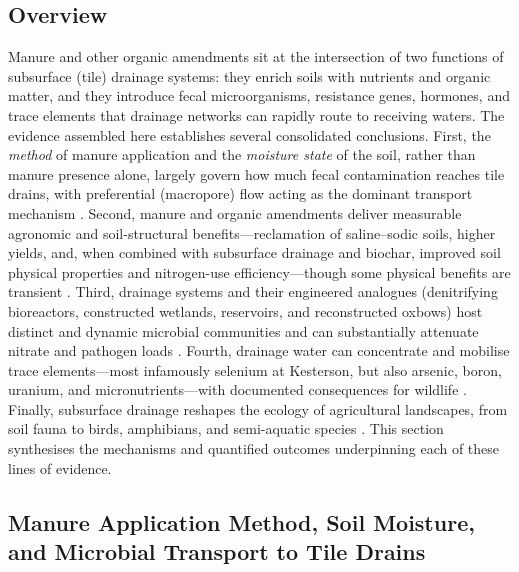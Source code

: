 \subsection{Overview}

Manure and other organic amendments sit at the intersection of two functions of subsurface (tile) drainage systems: they enrich soils with nutrients and organic matter, and they introduce fecal microorganisms, resistance genes, hormones, and trace elements that drainage networks can rapidly route to receiving waters. The evidence assembled here establishes several consolidated conclusions. First, the \emph{method} of manure application and the \emph{moisture state} of the soil, rather than manure presence alone, largely govern how much fecal contamination reaches tile drains, with preferential (macropore) flow acting as the dominant transport mechanism \parencite{Truhlar2015,Thiagarajan2007,Collins2007,Ding2021}. Second, manure and organic amendments deliver measurable agronomic and soil-structural benefits---reclamation of saline--sodic soils, higher yields, and, when combined with subsurface drainage and biochar, improved soil physical properties and nitrogen-use efficiency---though some physical benefits are transient \parencite{Qadir2001,Tian2023b,Liu2025f,Xiong2025,Brikmans2025}. Third, drainage systems and their engineered analogues (denitrifying bioreactors, constructed wetlands, reservoirs, and reconstructed oxbows) host distinct and dynamic microbial communities and can substantially attenuate nitrate and pathogen loads \parencite{Andrus2014,Porter2015,Hathaway2015,Knorr2023,Schilling2017,Haverstock2017}. Fourth, drainage water can concentrate and mobilise trace elements---most infamously selenium at Kesterson, but also arsenic, boron, uranium, and micronutrients---with documented consequences for wildlife \parencite{SAIKI1987,Ohlendorf2002,Ryu2010,Gao2007,Tayfur2010,Gul2013}. Finally, subsurface drainage reshapes the ecology of agricultural landscapes, from soil fauna to birds, amphibians, and semi-aquatic species \parencite{Nuutinen2001,Marja2013,Dreyfuss2018,Campbell2023}. This section synthesises the mechanisms and quantified outcomes underpinning each of these lines of evidence.

\subsection{Manure Application Method, Soil Moisture, and Microbial Transport to Tile Drains}


